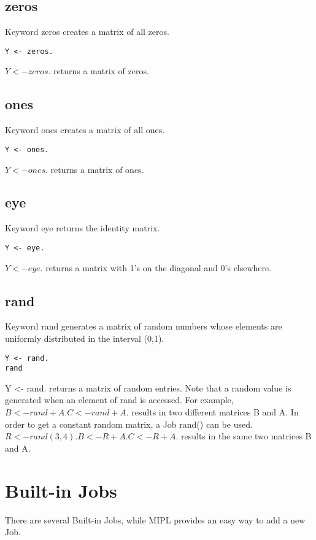 \documentclass[prodmode,acmtecs]{acmsmall}
\begin{document}
\subsection{zeros}
Keyword zeros creates a matrix of all zeros.
\begin{lstlisting}
Y <- zeros.
\end{lstlisting}

$Y <- zeros.$ returns a matrix of zeros.
\medskip

\subsection{ones}
Keyword ones creates a matrix of all ones.
\begin{lstlisting}
Y <- ones.
\end{lstlisting}

$Y <- ones.$ returns a matrix of ones.
\medskip

\subsection{eye}
Keyword eye returns the identity matrix.
\begin{lstlisting}
Y <- eye.
\end{lstlisting}

$Y <- eye.$ returns a matrix with 1's on the diagonal and 0's elsewhere.
\medskip

\subsection{rand}
Keyword rand generates a matrix of random numbers whose elements are
uniformly distributed in the interval (0,1).
\begin{lstlisting}
Y <- rand.
rand
\end{lstlisting}

Y <- rand. returns a matrix of random entries. Note that a random value
is generated when an element of rand is accessed. For example,
$B <- rand + A. C <- rand + A.$ results in two different matrices B and A.
In order to get a constant random matrix, a Job rand() can be used.
$R <- rand(3,4). B <- R + A. C <- R + A.$ results in the same two matrices B
and A.


\section{Built-in Jobs}
There are several Built-in Jobs, while MIPL provides an easy way
to add a new Job.
\medskip
\end{document}
